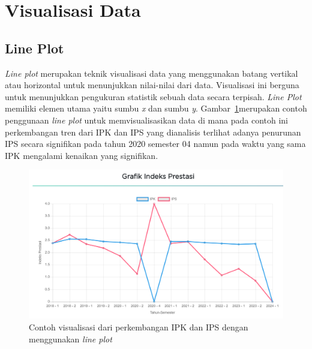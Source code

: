 \section{Visualisasi Data}
\label{sec:visdat}

\subsection{Line Plot}
\label{subsec:lineplo}

\textit{Line plot} merupakan teknik visualisasi data yang menggunakan batang vertikal atau horizontal untuk menunjukkan nilai-nilai dari data. Visualisasi ini berguna untuk menunjukkan pengukuran statistik sebuah data secara terpisah. \textit{Line Plot} memiliki elemen utama yaitu sumbu \textit{x} dan sumbu \textit{y}. Gambar~\ref{fig:contoh lineplot}merupakan contoh penggunaan \textit{line plot} untuk memvisualisasikan data di mana pada contoh ini perkembangan tren dari IPK dan IPS yang dianalisis terlihat adanya penurunan IPS secara signifikan pada tahun 2020 semester 04 namun pada waktu yang sama IPK mengalami kenaikan yang signifikan. 
\begin{figure}[H]
    \centering
    \includegraphics[width=0.5\linewidth]{Gambar/ContohLineChart.png}
    \caption{Contoh visualisasi dari perkembangan IPK dan IPS dengan menggunakan \textit{line plot}}
    \label{fig:contoh lineplot}
\end{figure}
